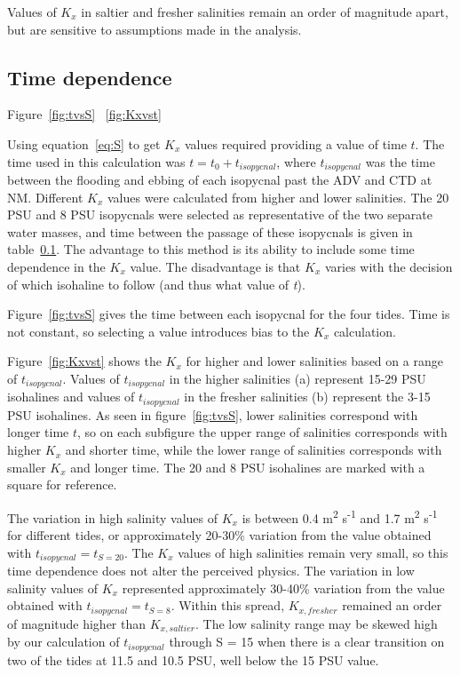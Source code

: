 Values of $K_x$ in saltier and fresher salinities remain an order of magnitude apart, but are sensitive to assumptions made in the analysis.

\subsection{Time dependence}

Figure~\ref{fig:tvsS} ~\ref{fig:Kxvst}

Using equation~\ref{eq:S} to get $K_x$ values required providing a value of time $t$. The time used in this calculation was $t=t_0 + t_{isopycnal}$, where $t_{isopycnal}$ was the time between the flooding and ebbing of each isopycnal past the ADV and CTD at NM. Different $K_x$ values were calculated from higher and lower salinities. The 20 PSU and 8 PSU isopycnals were selected as representative of the two separate water masses, and time between the passage of these isopycnals is given in table~\ref{}. The advantage to this method is its ability to include some time dependence in the $K_x$ value. The disadvantage is that $K_x$ varies with the decision of which isohaline to follow (and thus what value of \emph{t}). 

Figure~\ref{fig:tvsS} gives the time between each isopycnal for the four tides. Time is not constant, so selecting a value introduces bias to the $K_x$ calculation.

Figure~\ref{fig:Kxvst} shows the $K_x$ for higher and lower salinities based on a range of $t_{isopycnal}$. Values of $t_{isopycnal}$ in the higher salinities (a) represent 15-29 PSU isohalines and values of $t_{isopycnal}$ in the fresher salinities (b) represent the 3-15 PSU isohalines. As seen in figure~\ref{fig:tvsS}, lower salinities correspond with longer time $t$, so on each subfigure the upper range of salinities corresponds with higher $K_x$ and shorter time, while the lower range of salinities corresponds with smaller $K_x$ and longer time. The 20 and 8 PSU isohalines are marked with a square for reference.

The variation in high salinity values of $K_x$ is between 0.4 m\textsuperscript{2} s\textsuperscript{-1} and 1.7 m\textsuperscript{2} s\textsuperscript{-1} for different tides, or approximately 20-30\% variation from the value obtained with $t_{isopycnal}=t_{S=20}$. The $K_x$ values of high salinities remain very small, so this time dependence does not alter the perceived physics. The variation in low salinity values of $K_x$ represented approximately 30-40\% variation from the value obtained with $t_{isopycnal}=t_{S=8}$. Within this spread, $K_{x,fresher}$ remained an order of magnitude higher than $K_{x,saltier}$. The low salinity range may be skewed high by our calculation of $t_{isopycnal}$ through S = 15 when there is a clear transition on two of the tides at 11.5 and 10.5 PSU, well below the 15 PSU value. 

